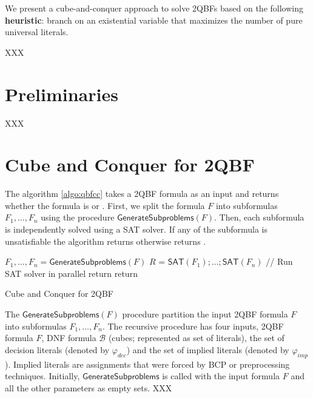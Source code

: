 \documentclass[runningheads]{llncs}
\newcommand{\matrixf}{\phi}
\newcommand{\qp}{\forall X \exists Y}
\newcommand{\FFF}{F}
\newcommand{\BB}{\mathcal{B}}
\newcommand{\dec}{\varphi_{dec}}
\newcommand{\imp}{\varphi_{imp}}
\def\preprocess{\mathsf{Preprocess}}
\def\split{\mathsf{GenerateSubproblems}}
\def\sat{\mathsf{SAT}}
\begin{document}
We present a cube-and-conquer approach to solve 2QBFs based on the following \textbf{heuristic}: branch on an existential variable that maximizes the number of pure universal literals.

XXX

\section{Preliminaries} \label{sec:preliminaries}
XXX

\section{Cube and Conquer for 2QBF} \label{sec:cc-qbf}

The algorithm \ref{algo:qbfcc} takes a 2QBF formula as an input and returns whether the formula is \TRUE\space or \FALSE. First, we split the formula $\FFF$ into subformulas $F_1, \dots, F_n$ using the procedure $\split(\FFF)$. Then, each subformula is independently solved using a SAT solver. If any of the subformula is unsatisfiable the algorithm returns \FALSE\space otherwise returns \TRUE.

\begin{algorithm}[]
	\DontPrintSemicolon
	\SetAlgoLined
	\KwData{A 2QBF formula $\FFF = \qp.\matrixf$}
	$F_1,\dots,F_n = \split (\FFF)$ \;
	$R$ = $\sat(F_1); \dots; \sat (F_n)$  // Run SAT solver in parallel \;
	\eIf{ $\exists r \in R$:
		$\sat(r)$ == \FALSE \;
		}
	{ %
		return \FALSE 
	} %
	{ %
	return \TRUE } 
	\caption{Cube and Conquer for 2QBF}
	\label{algo:qbfcc}
\end{algorithm}


The $\split(\FFF)$ procedure partition the input 2QBF formula $\FFF$ into subformulas $F_1, \dots, F_n$. 
The recursive procedure has four inputs, 2QBF formula $\FFF$, DNF formula $\BB$ (cubes; represented as set of literals), the set of decision literals (denoted by $\dec$) and the set of implied literals (denoted by $\imp$). Implied literals are assignments that were forced by BCP or preprocessing techniques. Initially, $\split$ is called with the input formula $\FFF$ and all the other parameters as empty sets. XXX
\end{document}
